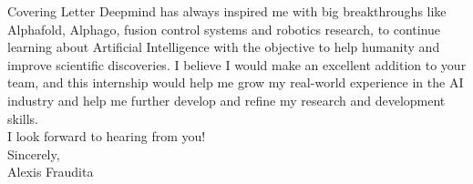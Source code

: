 \documentclass{letter} %
\begin{document}
\begin{rSection}{Covering Letter}
Deepmind has always inspired me with big breakthroughs like Alphafold, Alphago, 
fusion control systems and robotics research, to continue learning about
Artificial Intelligence with the objective to help humanity and improve scientific
discoveries. I believe I would make an excellent addition to your team, and this 
internship would help me grow my real-world experience in the AI industry and 
help me further develop and refine my research and development skills.\\

I look forward to hearing from you!\\

Sincerely,\\
Alexis Fraudita


\end{rSection}
\end{document}
